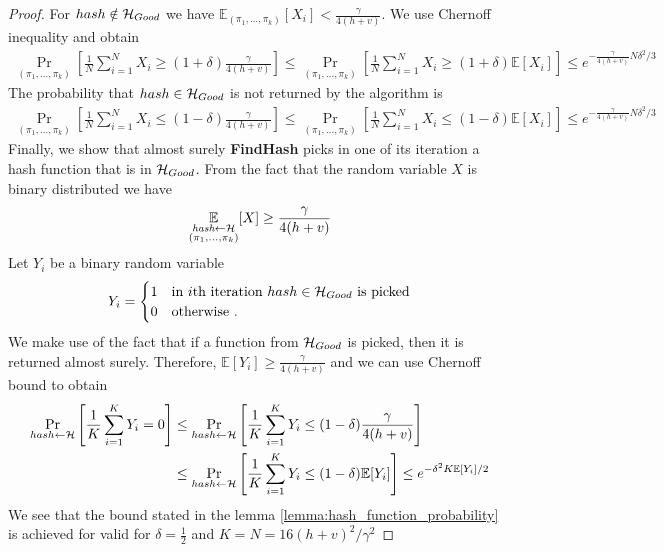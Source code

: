 \begin{proof}
For $hash \notin \mathcal{H}_{Good}$ we have $\mathbb{E}_{(\pi_1, \dots, \pi_k)}[X_i] < \frac{\gamma}{4(h+v)}$.
We use Chernoff inequality and obtain
\begin{align*}
  \underset{(\pi_1, \dots, \pi_k)}{\Pr} \left[\frac{1}{N} \sum_{i=1}^{N} X_i \geq (1 + \delta) \frac{\gamma}{4(h+v)} \right] \leq
  \underset{(\pi_1, \dots, \pi_k)}{\Pr}\left[\frac{1}{N} \sum_{i=1}^{N} X_i \geq (1 + \delta) \mathbb{E}[X_i]\right] \leq
  e^{-{\frac{\gamma}{4(h+v)}} N \delta^2 /3}
\end{align*}
%
The probability that $hash \in \mathcal{H}_{Good}$ is not returned by the algorithm is
\begin{align*}
  \underset{(\pi_1, \dots, \pi_k)}{\Pr}[\frac{1}{N} \sum_{i=1}^{N} X_i \leq (1 - \delta) \frac{\gamma}{4(h+v)}] \leq
  \underset{(\pi_1, \dots, \pi_k)}{\Pr}[\frac{1}{N} \sum_{i=1}^{N} X_i \leq (1 - \delta) \mathbb{E}[X_i]] \leq e^{-{\frac{\gamma}{4(h+v)}} N \delta^2 /3}
\end{align*}
%
Finally, we show that almost surely \textbf{FindHash} picks in one of its iteration a hash function that is in $\mathcal{H}_{Good}$.
From the fact that the random variable $X$ is binary distributed we have
\begin{align*}
  \underset{\substack{\textit{hash} \leftarrow \mathcal{H} \\ (\pi_1, \dots, \pi_k)}}{\mathbb{E}}[X] \geq \frac{\gamma}{4(h+v)}
\end{align*}
Let $Y_i$ be a binary random variable
\begin{align*}
  Y_i =
  \begin{cases}
    1 & \text{in $i$th iteration $hash \in \mathcal{H}_{Good}$ is picked} \\
    0 & \text{otherwise .}
  \end{cases}
\end{align*}
We make use of the fact that if a function from $\mathcal{H}_{Good}$ is picked, then it is returned almost surely. Therefore,
$\mathbb{E}[Y_i] \geq \frac{\gamma}{4(h+v)}$ and we can use Chernoff bound to obtain
\begin{align*}
  \underset{hash \leftarrow \mathcal{H}}{\Pr}\left[\frac{1}{K} \sum_{i=1}^{K} Y_i = 0\right] &\leq
  \underset{hash \leftarrow \mathcal{H}}{\Pr}\left[\frac{1}{K} \sum_{i=1}^{K} Y_i \leq (1-\delta) \frac{\gamma}{4(h+v)}\right] \\
  &\leq \underset{hash \leftarrow \mathcal{H}}{\Pr}\left[\frac{1}{K} \sum_{i=1}^{K} Y_i \leq (1-\delta) \mathbb{E}[Y_i] \right] \leq e^{-\delta^2K \mathbb{E}[Y_i]/2 }
\end{align*}
We see that the bound stated in the lemma \ref{lemma:hash_function_probability} is achieved for valid for $\delta = \frac{1}{2}$ and $K = N = 16(h+v)^2/\gamma^2$
\end{proof}
